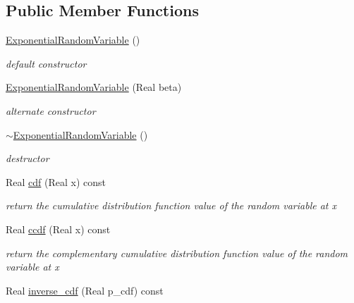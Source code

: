 \subsection*{Public Member Functions}
\begin{DoxyCompactItemize}
\item 
\hyperlink{classPecos_1_1ExponentialRandomVariable_a649f7f5eda7937ba25ae93c6a49c39c2}{Exponential\+Random\+Variable} ()\label{classPecos_1_1ExponentialRandomVariable_a649f7f5eda7937ba25ae93c6a49c39c2}

\begin{DoxyCompactList}\small\item\em default constructor \end{DoxyCompactList}\item 
\hyperlink{classPecos_1_1ExponentialRandomVariable_a9666904f0a8ac0f1b154bd6a840e3b49}{Exponential\+Random\+Variable} (Real beta)\label{classPecos_1_1ExponentialRandomVariable_a9666904f0a8ac0f1b154bd6a840e3b49}

\begin{DoxyCompactList}\small\item\em alternate constructor \end{DoxyCompactList}\item 
\hyperlink{classPecos_1_1ExponentialRandomVariable_ae1786ff9437473f381ece94d313975b2}{$\sim$\+Exponential\+Random\+Variable} ()\label{classPecos_1_1ExponentialRandomVariable_ae1786ff9437473f381ece94d313975b2}

\begin{DoxyCompactList}\small\item\em destructor \end{DoxyCompactList}\item 
Real \hyperlink{classPecos_1_1ExponentialRandomVariable_addd564e7f4f314e12d38df74d845f0d8}{cdf} (Real x) const \label{classPecos_1_1ExponentialRandomVariable_addd564e7f4f314e12d38df74d845f0d8}

\begin{DoxyCompactList}\small\item\em return the cumulative distribution function value of the random variable at x \end{DoxyCompactList}\item 
Real \hyperlink{classPecos_1_1ExponentialRandomVariable_a23c3b599e7e4788a9a5e9e93c3dbaf4d}{ccdf} (Real x) const \label{classPecos_1_1ExponentialRandomVariable_a23c3b599e7e4788a9a5e9e93c3dbaf4d}

\begin{DoxyCompactList}\small\item\em return the complementary cumulative distribution function value of the random variable at x \end{DoxyCompactList}\item 
Real \hyperlink{classPecos_1_1ExponentialRandomVariable_a918a1aac05ca349ea5313eebcba46c3e}{inverse\+\_\+cdf} (Real p\+\_\+cdf) const \label{classPecos_1_1ExponentialRandomVariable_a918a1aac05ca349ea5313eebcba46c3e}


\end{DoxyCompactItemize}

